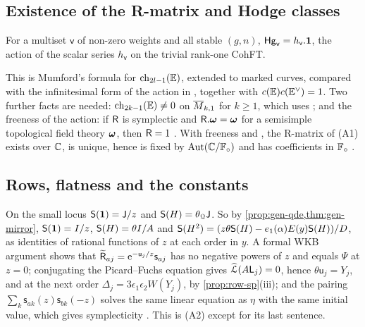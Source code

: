 \subsection{Existence of the R-matrix and Hodge classes}

\begin{lem}
\label{lem:gen-mumford}
For a multiset $\mathsf{v}$ of non-zero weights and all stable $(g,n)$, $\mathsf{Hg}_{\mathsf{v}}=h_{\mathsf{v}}.\mathbf{1}$, the action of the scalar series $h_{\mathsf{v}}$ on the trivial rank-one CohFT.
\end{lem}

This is Mumford's formula \cite[Theorem (Mumford), Section~1.1]{FP00} for $\mathrm{ch}_{2l-1}(\mathbb{E})$, extended to marked curves, compared with the infinitesimal form of the action in \cite[Proposition~2.14]{PPZ15}, together with $c(\mathbb{E})c(\mathbb{E}^\vee)=1$. Two further facts are needed: $\mathrm{ch}_{2k-1}(\mathbb{E})\neq0$ on $\overline{M}_{k,1}$ for $k\geq1$, which uses \cite[Theorem 4]{FP00} ; and the freeness of the action: if $\mathsf{R}$ is symplectic and $\mathsf{R}.\boldsymbol{\omega}=\boldsymbol{\omega}$ for a semisimple topological field theory $\boldsymbol{\omega}$, then $\mathsf{R}=1$ . With freeness and \cite[Theorem (2), Proposition~8.7(ii)]{Tel12}, the R-matrix of \textup{(A1)} exists over $\mathbb{C}$, is unique, hence is fixed by $\operatorname{Aut}(\mathbb{C}/\mathbb{F}_{\circ})$ and has coefficients in $\mathbb{F}_{\circ}$ .

\subsection{Rows, flatness and the constants}

On the small locus $\mathsf{S}(\mathbf{1})=\mathsf{J}/z$ and $\mathsf{S}(H)=\theta_{\mathcal{Q}}\mathsf{J}$. So by \cref{prop:gen-qde,thm:gen-mirror}, $\mathsf{S}(\mathbf{1})=I/z$, $\mathsf{S}(H)=\theta I/A$ and $\mathsf{S}(H^2)=(z\theta\mathsf{S}(H)-e_1(\alpha)E(y)\mathsf{S}(H))/D$, as identities of rational functions of $z$ at each order in $y$. A formal WKB argument shows that $\widetilde{\mathsf{R}}_{aj}=\mathrm{e}^{-\mathsf{u}_j/z}\mathsf{s}_{aj}$ has no negative powers of $z$ and equals $\Psi$ at $z=0$; conjugating the Picard--Fuchs equation gives $\widehat{\mathcal{L}}(A\mathsf{L}_j)=0$, hence $\theta\mathsf{u}_j=Y_j$, and at the next order $\Delta_j=3\epsilon_1\epsilon_2W(Y_j)$, by \cref{prop:row-sp}\textup{(iii)}; and the pairing $\sum_k\mathsf{s}_{ak}(z)\mathsf{s}_{bk}(-z)$ solves the same linear equation as $\eta$ with the same initial value, which gives symplecticity . This is \textup{(A2)} except for its last sentence.

